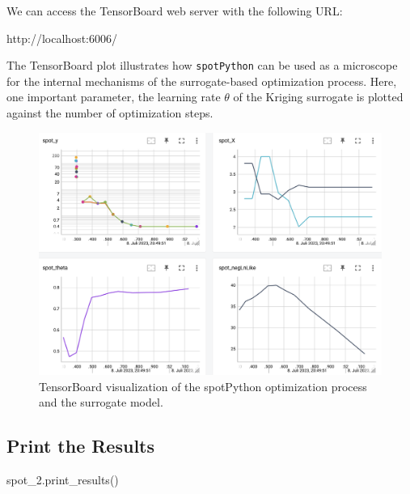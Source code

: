 \documentclass[
  letterpaper,
  DIV=11,
  numbers=noendperiod]{scrreprt}
\newenvironment{Shaded}{\begin{snugshade}}{\end{snugshade}}
\newcommand{\NormalTok}[1]{\textcolor[rgb]{0.00,0.23,0.31}{#1}}
\begin{document}
We can access the TensorBoard web server with the following URL:

\begin{Shaded}
\begin{Highlighting}[]
\NormalTok{http://localhost:6006/}
\end{Highlighting}
\end{Shaded}

The TensorBoard plot illustrates how \texttt{spotPython} can be used as
a microscope for the internal mechanisms of the surrogate-based
optimization process. Here, one important parameter, the learning rate
\(\theta\) of the Kriging surrogate is plotted against the number of
optimization steps.

\begin{figure}[H]

{\centering \includegraphics[width=1\textwidth,height=\textheight]{figures_static/04_tensorboard_01.png}

}

\caption{TensorBoard visualization of the spotPython optimization
process and the surrogate model.}

\end{figure}%

\subsection{Print the Results}\label{print-the-results-2}

\begin{Shaded}
\begin{Highlighting}[]
\NormalTok{spot\_2.print\_results()}
\end{Highlighting}
\end{Shaded}
\end{document}
